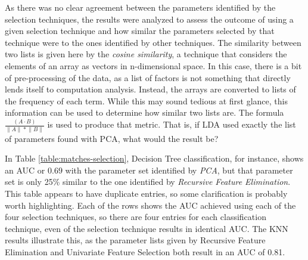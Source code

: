 \documentclass[letterpaper, notitlepage]{report}
\begin{document}
As there was no clear agreement between the parameters identified by the selection techniques, the results were analyzed to assess the outcome of using a given selection technique and how similar the parameters selected by that technique were to the ones identified by other techniques.  The similarity between two lists is given here by the \textit{cosine similarity}, a technique that considers the elements of an array as vectors in n-dimensional space. In this case, there is a bit of pre-processing of the data, as a list of factors is not something that directly lends itself to computation analysis. Instead, the arrays are converted to lists of the frequency of each term. While this may sound tedious at first glance, this information can be used to determine how similar two lists are. The formula $\frac {(A \cdot B)} { \lVert A \rVert * \lVert B \rVert }$ is used to produce that metric. That is, if LDA used exactly the list of parameters found with PCA, what would the result be?

In Table \ref{table:matches-selection}, Decision Tree classification, for instance, shows an AUC or $0.69$ with the parameter set identified by \textit{PCA}, but that parameter set is only 25\% similar to the one identified by \textit{Recursive Feature Elimination}.  This table appears to have duplicate entries, so some clarification is probably worth highlighting. Each of the rows shows the AUC achieved using each of the four selection techniques, so there are four entries for each classification technique, even of the selection technique results in identical AUC. The KNN results illustrate this, as the parameter lists given by Recursive Feature Elimination and Univariate Feature Selection both result in an AUC of 0.81.
\end{document}
